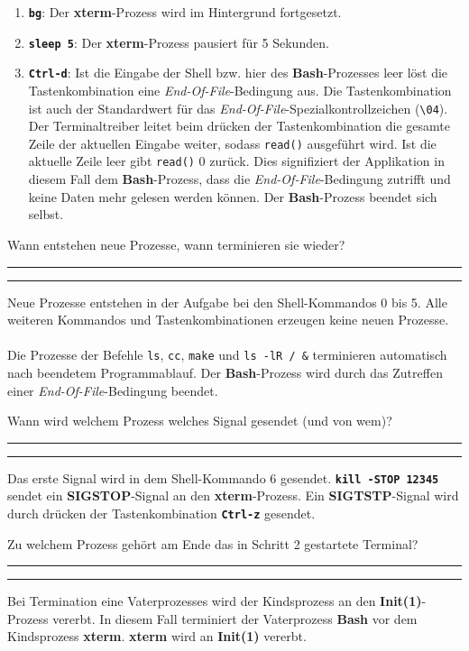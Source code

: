 \documentclass{ti2}
\makeatletter
\renewenvironment{quote}{%
  \vskip 10\p@
  \parindent\z@
  \tcolorbox[
    breakable, sharp corners,
    boxrule=\z@, boxsep=\z@,
    left=\z@, right=\z@,
    top=\z@, bottom=\z@,
    colback=sx-yellow
  ]
  {\color{sx-orange}\d@ublerule}
  \vskip 5\p@
  \list{}{\rightmargin\leftmargin}%
  \item\relax
}{%
  \endlist
  {\color{sx-orange}\d@ublerule}
  \endtcolorbox
  \vskip 5\p@
}
\def\d@ublerule{\hrule\@width\hsize\kern 1.5\p@\hrule\@width\hsize}
\makeatother
\begin{document}
\begin{enumerate}
	\item \texttt{\textbf{bg}}: Der \textbf{xterm}-Prozess wird im Hintergrund fortgesetzt.
	\item \texttt{\textbf{sleep 5}}: Der \textbf{xterm}-Prozess pausiert für 5 Sekunden.
	\item \texttt{\textbf{Ctrl-d}}: Ist die Eingabe der Shell bzw. hier des \textbf{Bash}-Prozesses leer löst die Tastenkombination eine \textit{End-Of-File}-Bedingung aus. Die Tastenkombination ist auch der Standardwert für das \textit{End-Of-File}-Spezialkontrollzeichen (\texttt{\textbackslash 04}). Der Terminaltreiber leitet beim drücken der Tastenkombination die gesamte Zeile der aktuellen Eingabe weiter, sodass \texttt{read()} ausgeführt wird. Ist die aktuelle Zeile leer gibt \texttt{read()} 0 zurück. Dies signifiziert der Applikation in diesem Fall dem \textbf{Bash}-Prozess, dass die \textit{End-Of-File}-Bedingung zutrifft und keine Daten mehr gelesen werden können. Der \textbf{Bash}-Prozess beendet sich selbst. 
\end{enumerate}
\begin{quote}
Wann entstehen neue Prozesse, wann terminieren sie wieder?
\end{quote}
Neue Prozesse entstehen in der Aufgabe bei den Shell-Kommandos 0 bis 5. Alle weiteren Kommandos und Tastenkombinationen erzeugen keine neuen Prozesse.\\ \\
Die Prozesse der Befehle \texttt{ls}, \texttt{cc}, \texttt{make} und \texttt{ls -lR / \&} terminieren automatisch nach beendetem Programmablauf. Der \textbf{Bash}-Prozess wird durch das Zutreffen einer \textit{End-Of-File}-Bedingung beendet.
\begin{quote}
Wann wird welchem Prozess welches Signal gesendet (und von wem)?
\end{quote}
Das erste Signal wird in dem Shell-Kommando 6 gesendet. \texttt{\textbf{kill -STOP 12345}} sendet ein \textbf{SIGSTOP}-Signal an den \textbf{xterm}-Prozess. Ein \textbf{SIGTSTP}-Signal wird durch drücken der Tastenkombination \texttt{\textbf{Ctrl-z}} gesendet.
\begin{quote}
Zu welchem Prozess gehört am Ende das in Schritt 2 gestartete Terminal?
\end{quote}
Bei Termination eine Vaterprozesses wird der Kindsprozess an den \textbf{Init(1)}-Prozess vererbt. In diesem Fall terminiert der Vaterprozess \textbf{Bash} vor dem Kindsprozess \textbf{xterm}. \textbf{xterm} wird an \textbf{Init(1)} vererbt.
\end{document}
